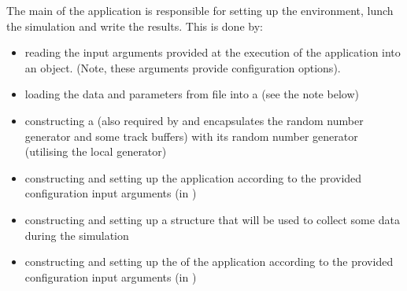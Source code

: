 \documentclass[letterpaper,10pt,english]{sphinxmanual}
\begin{document}
\sphinxAtStartPar
The main of the  application is responsible for setting up the environment, lunch the simulation and write the results. This is done by:\begin{itemize}
\item {} 
\sphinxAtStartPar
reading the input arguments provided at the execution of the application into an  object. (Note, these arguments provide configuration options).

\item {} 
\sphinxAtStartPar
loading the  data and parameters from file into a  (see the note below)

\item {} 
\sphinxAtStartPar
constructing a  (also required by  and encapsulates the random number generator and some track buffers) with its random number generator (utilising the local  generator)

\item {} 
\sphinxAtStartPar
constructing and setting up the application  according to the provided configuration input arguments (in )

\item {} 
\sphinxAtStartPar
constructing and setting up a  structure that will be used to collect some data during the simulation

\item {} 
\sphinxAtStartPar
constructing and setting up the  of the application according to the provided configuration input arguments (in )


\end{itemize}
\end{document}
